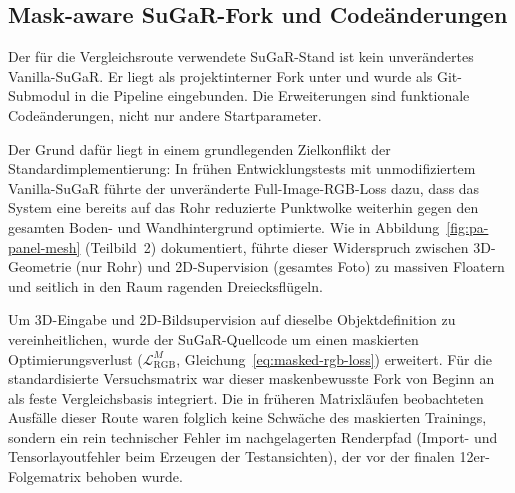 \subsection{Mask-aware SuGaR-Fork und Codeänderungen}

Der für die Vergleichsroute verwendete SuGaR-Stand ist kein unverändertes
Vanilla-SuGaR. Er liegt als projektinterner Fork unter
 und wurde als Git-Submodul in die Pipeline eingebunden.
Die Erweiterungen sind funktionale Codeänderungen, nicht nur andere
Startparameter.

Der Grund dafür liegt in einem grundlegenden Zielkonflikt der
Standardimplementierung: In frühen Entwicklungstests mit unmodifiziertem
Vanilla-SuGaR führte der unveränderte Full-Image-RGB-Loss dazu, dass das
System eine bereits auf das Rohr reduzierte Punktwolke weiterhin gegen den
gesamten Boden- und Wandhintergrund optimierte. Wie in
Abbildung~\ref{fig:pa-panel-mesh} (Teilbild~2) dokumentiert, führte dieser
Widerspruch zwischen 3D-Geometrie (nur Rohr) und 2D-Supervision (gesamtes
Foto) zu massiven Floatern und seitlich in den Raum ragenden Dreiecksflügeln.

Um 3D-Eingabe und 2D-Bildsupervision auf dieselbe Objektdefinition zu
vereinheitlichen, wurde der SuGaR-Quellcode um einen maskierten
Optimierungsverlust ($\mathcal{L}_{\mathrm{RGB}}^{M}$,
Gleichung~\ref{eq:masked-rgb-loss}) erweitert. Für die standardisierte
Versuchsmatrix war dieser maskenbewusste Fork von Beginn an als feste
Vergleichsbasis integriert. Die in früheren Matrixläufen beobachteten Ausfälle
dieser Route waren folglich keine Schwäche des maskierten Trainings, sondern
ein rein technischer Fehler im nachgelagerten Renderpfad (Import- und
Tensorlayoutfehler beim Erzeugen der Testansichten), der vor der finalen
12er-Folgematrix behoben wurde.

